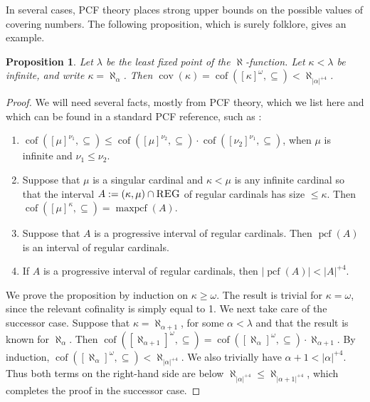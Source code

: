 \documentclass{article}
\newtheorem{prop}[thm]{Proposition}
\DeclareMathOperator{\cof}{cof}
\begin{document}
In several cases, \textsc{PCF} theory places strong upper bounds on the possible values of covering numbers.
The following proposition, which is surely folklore, gives an example.



\begin{prop}\label{pr:fixpt}
    Let $\lambda$ be the least fixed point of the $\aleph$-function. 
    Let $\kappa<\lambda$ be infinite, and write $\kappa=\aleph_\alpha$. 
    Then $\mathop{cov}(\kappa)=\cof([\kappa]^\omega,\subseteq)<\aleph_{|\alpha|^{+4}}$.
\end{prop}
\begin{proof}
    We will need several facts, mostly from \textsc{PCF} theory, which we list here and which can be found in a standard \textsc{PCF} reference, such as \cite{AbrahamMagidor}:
    \begin{enumerate}[nosep,topsep=1pt]
        \item[(1)] 
        $\cof([\mu]^{\nu_1},\subseteq)\leq\cof([\mu]^{\nu_2},\subseteq)\cdot\cof([\nu_2]^{\nu_1},\subseteq)$, when
        $\mu$ is infinite and $\nu_1\leq\nu_2$. 
        \item[(2)] Suppose that $\mu$ is a singular cardinal and $\kappa<\mu$ is any infinite cardinal so that the interval $A:=(\kappa,\mu)\cap\textsc{REG}$ of regular cardinals has size $\leq\kappa$.
        Then 
        $\cof([\mu]^{\kappa},\subseteq)=\operatorname{maxpcf}(A)$.
        \item[(3)] Suppose that $A$ is a progressive interval of regular cardinals.
        Then $\operatorname{pcf}(A)$ is an interval of regular cardinals.
        \item[(4)] If $A$ is a progressive interval of regular cardinals, then 
        $|\operatorname{pcf}(A)|<|A|^{+4}$.        
    \end{enumerate}

We prove the proposition by induction on $\kappa\geq\omega$. The result is trivial for $\kappa=\omega$, since the relevant cofinality is simply equal to 1.
We next take care of the successor case. 
Suppose that $\kappa=\aleph_{\alpha+1}$, for some $\alpha<\lambda$ and that the result is known for $\aleph_\alpha$.
Then
$
\cof([\aleph_{\alpha+1}]^\omega,\subseteq)=\cof([\aleph_\alpha]^\omega,\subseteq)\cdot\aleph_{\alpha+1}
$.
By induction, $\cof([\aleph_\alpha]^\omega,\subseteq)<\aleph_{|\alpha|^{+4}}$.
We also trivially have $\alpha+1<|\alpha|^{+4}$.
Thus both terms on the right-hand side are below $\aleph_{|\alpha|^{+4}}\leq\aleph_{|\alpha+1|^{+4}}$, which completes the proof in the successor case.


\end{proof}
\end{document}
